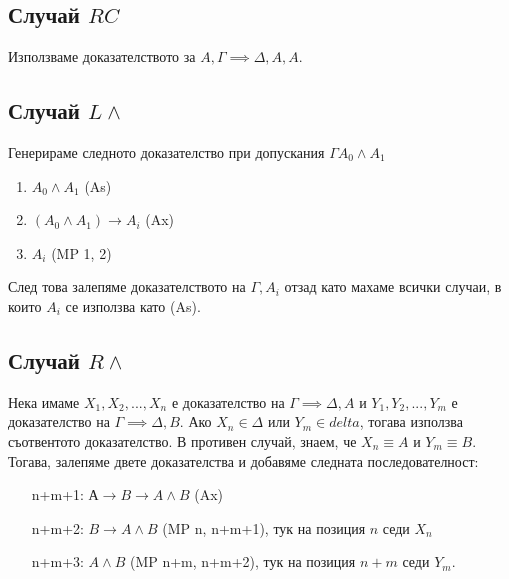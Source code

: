 \documentclass[12pt]{article}
\begin{document}
\subsection*{Случай $RC$}
Използваме доказателството за $A, \Gamma \implies \Delta, A, A$.
\subsection*{Случай $L \land$}
Генерираме следното доказателство при допускания $\Gamma A_0 \land A_1$
\begin{enumerate}
    \item $A_0 \land A_1$ (As)
    \item $(A_0 \land A_1) \rightarrow A_i$ (Ax)
    \item $A_i$ (MP 1, 2) 
\end{enumerate}
След това залепяме доказателството на $\Gamma, A_i$ отзад като махаме всички случаи, в които $A_i$ се използва като (As).
\subsection*{Случай $R \land$}
Нека имаме $X_1, X_2, ..., X_n$ е доказателство на $\Gamma \implies \Delta, A$ и $Y_1, Y_2, ..., Y_m$ е доказателство на $\Gamma \implies \Delta, B$. Ако $X_n \in \Delta$ или $Y_m \in delta$, тогава използва съотвентото доказателство. В противен случай, знаем, че $X_n \equiv A$ и $Y_m \equiv B$. Тогава, залепяме двете доказателства и добавяме следната последователност:
\begin{itemize}[itemindent=4em]
    \item[n+m+1: ] $А \rightarrow B \rightarrow A \land B$ (Ax)    
    \item[n+m+2: ] $B \rightarrow A \land B$ (MP n, n+m+1), тук на позиция $n$ седи $X_n$ 
    \item[n+m+3: ] $A \land B$ (MP n+m, n+m+2), тук на позиция $n+m$ седи $Y_m$.
\end{itemize}
\end{document}
